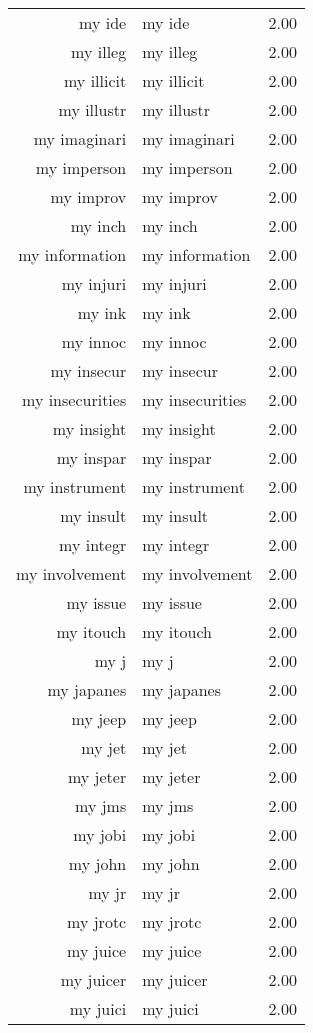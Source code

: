 \begin{table}[ht]
\begin{tabular}{rlr}
  my ide & my ide & 2.00 \\ 
  my illeg & my illeg & 2.00 \\ 
  my illicit & my illicit & 2.00 \\ 
  my illustr & my illustr & 2.00 \\ 
  my imaginari & my imaginari & 2.00 \\ 
  my imperson & my imperson & 2.00 \\ 
  my improv & my improv & 2.00 \\ 
  my inch & my inch & 2.00 \\ 
  my information & my information & 2.00 \\ 
  my injuri & my injuri & 2.00 \\ 
  my ink & my ink & 2.00 \\ 
  my innoc & my innoc & 2.00 \\ 
  my insecur & my insecur & 2.00 \\ 
  my insecurities & my insecurities & 2.00 \\ 
  my insight & my insight & 2.00 \\ 
  my inspar & my inspar & 2.00 \\ 
  my instrument & my instrument & 2.00 \\ 
  my insult & my insult & 2.00 \\ 
  my integr & my integr & 2.00 \\ 
  my involvement & my involvement & 2.00 \\ 
  my issue & my issue & 2.00 \\ 
  my itouch & my itouch & 2.00 \\ 
  my j & my j & 2.00 \\ 
  my japanes & my japanes & 2.00 \\ 
  my jeep & my jeep & 2.00 \\ 
  my jet & my jet & 2.00 \\ 
  my jeter & my jeter & 2.00 \\ 
  my jms & my jms & 2.00 \\ 
  my jobi & my jobi & 2.00 \\ 
  my john & my john & 2.00 \\ 
  my jr & my jr & 2.00 \\ 
  my jrotc & my jrotc & 2.00 \\ 
  my juice & my juice & 2.00 \\ 
  my juicer & my juicer & 2.00 \\ 
  my juici & my juici & 2.00 \\ 

\end{tabular}
\end{table}
